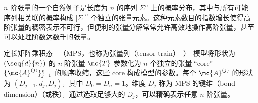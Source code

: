 $n$ 阶张量的一个自然例子是长度为 $n$ 的序列 $\Sigma^n$ 上的概率分布，其中与所有可能序列相关联的概率构成 $|\Sigma|^n$ 个独立的张量元素。这种元素数目的指数增长使得高阶张量的稠密表示不可行，但便利的张量分解常常允许高效地操作高阶张量，甚至可以处理阶数达数千的张量。

定长矩阵乘积态~\citep{perez2007}~（MPS，也称为张量列（tensor train）~\citep{oseledets2011}）~模型将形状为 $(\seq{d}{n})$ 的 $n$ 阶张量 $\mc{T}$ 参数化为 $n$ 个独立的张量 ``core'' $\{\mc{A}^{(j)}\}_{j=1}^n$ 的顺序收缩，这些 core 构成模型的参数。每个 $\mc{A}^{(j)}$ 的形状为 $(D_{j-1}, d_j, D_j)$，其中 $D_0 = D_n = 1$。维度 $D_j$ 称为 MPS 的键维（bond dimension）（或秩），通过选取足够大的 $D_j$，可以精确表示任意 $n$ 阶张量。

